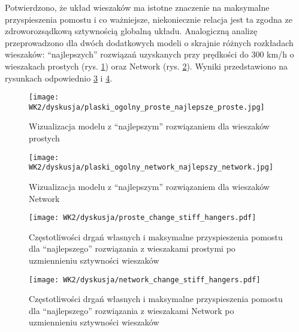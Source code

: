 Potwierdzono, że układ wieszaków ma istotne znaczenie na maksymalne przyspieszenia pomostu i co ważniejsze, niekoniecznie relacja jest ta zgodna ze zdroworozsądkową sztywnością globalną układu. Analogiczną analizę przeprowadzono dla dwóch dodatkowych modeli o skrajnie różnych rozkładach wieszaków: \enquote{najlepszych} rozwiązań uzyskanych przy prędkości do 300 km/h o wieszakach prostych (rys. \ref{fig:proste_najlepsze_wiz}) oraz Network (rys. \ref{fig:network_najlepsze_wiz}). Wyniki przedstawiono na rysunkach odpowiednio \ref{fig:proste_change_hangers_stiff} i \ref{fig:network_change_hangers_stiff}. 

\begin{figure}[hbt!]
	\centering
	\texttt{[image: WK2/dyskusja/plaski\_ogolny\_proste\_najlepsze\_proste.jpg]}
	\captionsetup{justification=centering}
	\caption{Wizualizacja modelu z \enquote{najlepszym} rozwiązaniem dla wieszaków prostych}
	\label{fig:proste_najlepsze_wiz}
\end{figure}

\begin{figure}[hbt!]
	\centering
	\texttt{[image: WK2/dyskusja/plaski\_ogolny\_network\_najlepszy\_network.jpg]}
	\captionsetup{justification=centering}
	\caption{Wizualizacja modelu z \enquote{najlepszym} rozwiązaniem dla wieszaków Network}
	\label{fig:network_najlepsze_wiz}
\end{figure}


\begin{figure}[hbt!]
	\centering
	\texttt{[image: WK2/dyskusja/proste\_change\_stiff\_hangers.pdf]}
	\captionsetup{justification=centering}
	\caption{Częstotliwości drgań własnych i maksymalne przyspieszenia pomostu dla \enquote{najlepszego} rozwiązania z wieszakami prostymi po uzmiennieniu sztywności wieszaków}
	\label{fig:proste_change_hangers_stiff}
\end{figure}

\begin{figure}[hbt!]
	\centering
	\texttt{[image: WK2/dyskusja/network\_change\_stiff\_hangers.pdf]}
	\captionsetup{justification=centering}
	\caption{Częstotliwości drgań własnych i maksymalne przyspieszenia pomostu dla \enquote{najlepszego} rozwiązania z wieszakami Network po uzmiennieniu sztywności wieszaków}
	\label{fig:network_change_hangers_stiff}
\end{figure}

